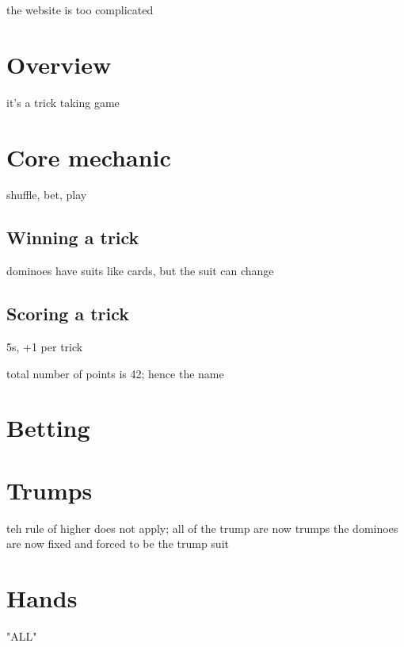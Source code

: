 
the website is too complicated


\section{Overview}

it's a trick taking game

\section{Core mechanic}

shuffle, bet, play

\subsection{Winning a trick}

dominoes have suits like cards, but the suit can change

\subsection{Scoring a trick}

5s, +1 per trick

total number of points is 42; hence the name

\section{Betting}


\section{Trumps}

teh rule of higher does not apply; all of the trump are now trumps
the dominoes are now fixed and forced to be the trump suit

\section{Hands}

"ALL"
